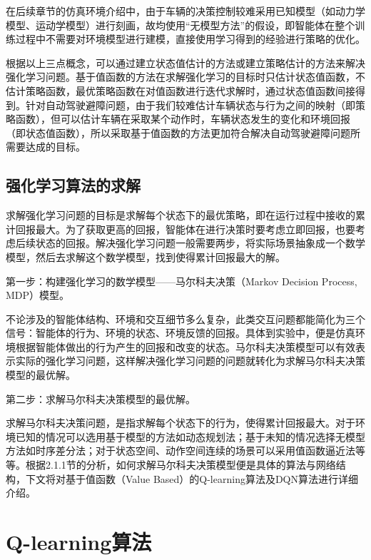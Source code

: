 在后续章节的仿真环境介绍中，由于车辆的决策控制较难采用已知模型（如动力学模型、运动学模型）进行刻画，故均使用“无模型方法”的假设，即智能体在整个训练过程中不需要对环境模型进行建模，直接使用学习得到的经验进行策略的优化。

根据以上三点概念，可以通过建立状态值估计的方法或建立策略估计的方法来解决强化学习问题。基于值函数的方法在求解强化学习的目标时只估计状态值函数，不估计策略函数，最优策略函数在对值函数进行迭代求解时，通过状态值函数间接得到。针对自动驾驶避障问题，由于我们较难估计车辆状态与行为之间的映射（即策略函数），但可以估计车辆在采取某个动作时，车辆状态发生的变化和环境回报（即状态值函数），所以采取基于值函数的方法更加符合解决自动驾驶避障问题所需要达成的目标。

\subsection{强化学习算法的求解} %

求解强化学习问题的目标是求解每个状态下的最优策略，即在运行过程中接收的累计回报最大。为了获取更高的回报，智能体在进行决策时要考虑立即回报，也要考虑后续状态的回报。解决强化学习问题一般需要两步，将实际场景抽象成一个数学模型，然后去求解这个数学模型，找到使得累计回报最大的解。

第一步：构建强化学习的数学模型——马尔科夫决策（Markov Decision Process, MDP）模型。

不论涉及的智能体结构、环境和交互细节多么复杂，此类交互问题都能简化为三个信号：智能体的行为、环境的状态、环境反馈的回报。具体到实验中，便是仿真环境根据智能体做出的行为产生的回报和改变的状态。马尔科夫决策模型可以有效表示实际的强化学习问题，这样解决强化学习问题的问题就转化为求解马尔科夫决策模型的最优解。

第二步：求解马尔科夫决策模型的最优解。

求解马尔科夫决策问题，是指求解每个状态下的行为，使得累计回报最大。对于环境已知的情况可以选用基于模型的方法如动态规划法；基于未知的情况选择无模型方法如时序差分法；对于状态空间、动作空间连续的场景可以采用值函数逼近法等等。根据2.1.1节的分析，如何求解马尔科夫决策模型便是具体的算法与网络结构，下文将对基于值函数（Value Based）的Q-learning算法及DQN算法进行详细介绍。

\section{Q-learning算法} %

